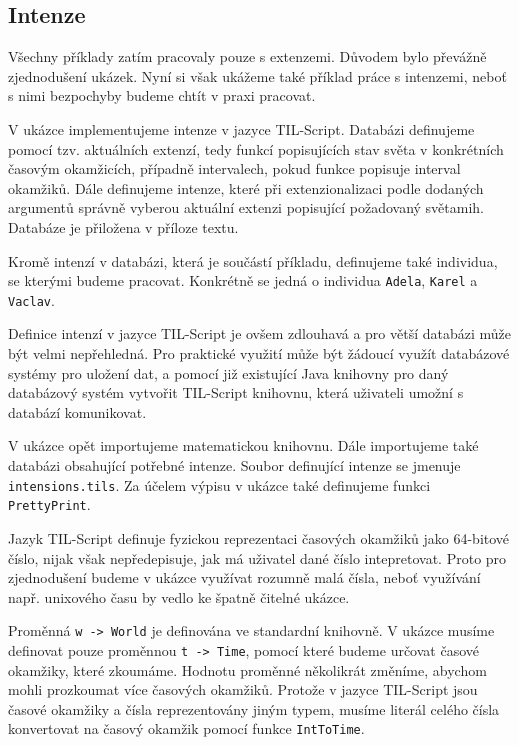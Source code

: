 \subsection{Intenze}

Všechny příklady zatím pracovaly pouze s extenzemi. Důvodem bylo převážně zjednodušení ukázek.
Nyní si však ukážeme také příklad práce s intenzemi, neboť s nimi bezpochyby budeme chtít v praxi
pracovat.

V ukázce implementujeme intenze v jazyce TIL-Script. Databázi definujeme pomocí tzv. aktuálních
extenzí, tedy funkcí popisujících stav světa v konkrétních časovým okamžicích, případně intervalech,
pokud funkce popisuje interval okamžiků. Dále definujeme intenze,
které při extenzionalizaci podle dodaných argumentů správně vyberou aktuální extenzi popisující
požadovaný světamih. Databáze je přiložena v příloze textu.

Kromě intenzí v databázi, která je součástí příkladu, definujeme také individua, se kterými budeme
pracovat. Konkrétně se jedná o individua \lstinline{Adela}, \lstinline{Karel} a \lstinline{Vaclav}.

Definice intenzí v jazyce TIL-Script je ovšem zdlouhavá a pro větší databázi může být velmi
nepřehledná. Pro praktické využití může být žádoucí využít databázové systémy pro uložení dat,
a pomocí již existující Java knihovny pro daný databázový systém vytvořit TIL-Script knihovnu,
která uživateli umožní s databází komunikovat.

V ukázce opět importujeme matematickou knihovnu. Dále importujeme také databázi obsahující potřebné
intenze. Soubor definující intenze se jmenuje \lstinline{intensions.tils}. Za účelem výpisu v ukázce
také definujeme funkci \lstinline{PrettyPrint}.

Jazyk TIL-Script definuje fyzickou reprezentaci časových okamžiků jako 64-bitové číslo, nijak však
nepředepisuje, jak má uživatel dané číslo intepretovat. Proto pro zjednodušení budeme v ukázce
využívat rozumně malá čísla, neboť využívání např. unixového času by vedlo ke špatně čitelné ukázce.

Proměnná \lstinline{w -> World} je definována ve standardní knihovně. V ukázce musíme definovat
pouze proměnnou \lstinline{t -> Time}, pomocí které budeme určovat časové okamžiky, které zkoumáme.
Hodnotu proměnné několikrát změníme, abychom mohli prozkoumat více časových okamžiků. Protože
v jazyce TIL-Script jsou časové okamžiky a čísla reprezentovány jiným typem, musíme literál celého
čísla konvertovat na časový okamžik pomocí funkce \lstinline{IntToTime}.

